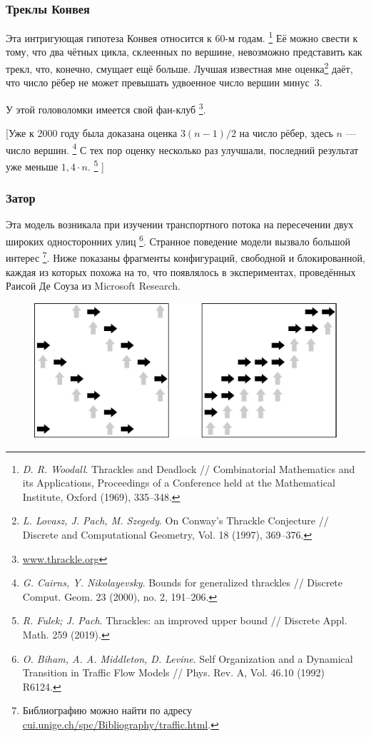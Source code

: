 \documentclass[twoside]{book}
\begin{document}
\subsubsection*{Треклы Конвея}

Эта интригующая гипотеза Конвея относится к 60-м годам.%
\footnote{\emph{D. R. Woodall}. Thrackles and Deadlock /\!/ {Combinatorial Mathematics and its Appli\-ca\-tions}, Proceedings of a Conference held at the Mathematical Institute, Oxford (1969), 335--348.}
Её можно свести к тому, что два чётных цикла, склеенных по вершине, невозможно представить как трекл,
что, конечно, смущает ещё больше.
Лучшая известная мне оценка\footnote{\emph{L. Lovasz, J. Pach, M. Szegedy}. On Conway's Thrackle Conjecture /\!/ {Discrete and Compu\-ta\-tional Geometry}, Vol. 18 (1997), 369--376.} даёт, что число рёбер не может превышать удвоенное число вершин минус~3.%

У этой головоломки имеется свой фан-клуб%
\footnote{\href{http://www.thrackle.org}{\url{www.thrackle.org}}}.

[Уже к 2000 году была доказана оценка $3(n-1)/2$ на число рёбер, здесь $n$ --- число вершин.%
\footnote{\emph{G. Cairns, Y. Nikolayevsky}.
Bounds for generalized thrackles /\!/ 
Discrete Comput. Geom. 23 (2000), no. 2, 191--206.}
С тех пор оценку несколько раз улучшали, последний результат уже меньше $1{,}4\cdot n$.%
\footnote{\emph{R. Fulek; J. Pach}. Thrackles: an improved upper bound /\!/  Discrete Appl. Math. 259 (2019).}%
]

\subsubsection*{Затор}

Эта модель возникала при изучении транспортного потока на пересечении двух широких односторонних улиц%
\footnote{\emph{O. Biham, A. A. Middleton, D. Levine}. Self Organization and a Dynamical Transition in Traffic Flow Models /\!/ {Phys. Rev. A}, Vol. 46.10 (1992) R6124.}.
Странное поведение модели вызвало большой интерес%
\footnote{Библиографию можно найти по адресу \href{http://cui.unige.ch/spc/Bibliography/traffic.html.}{\url{cui.unige.ch/spc/Bibliography/traffic.html}}.}.
Ниже показаны фрагменты конфигураций, свободной и блокированной, каждая из которых похожа на то, что появлялось в экспериментах, проведённых Раисой Де Соуза из Microsoft Research.

\begin{figure}[!ht]
\centering
\includegraphics{mp/wink-32}
\end{figure}
\end{document}
